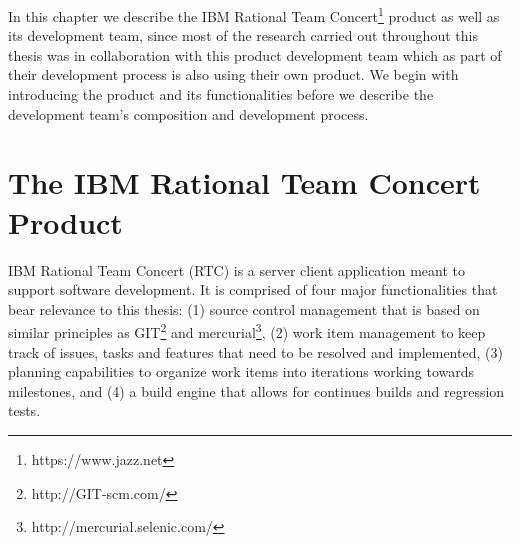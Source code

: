 \label{chap:rtc}
In this chapter we describe the IBM Rational Team Concert\footnote{https://www.jazz.net} product as well as its development team,
since most of the research carried out throughout this thesis was in collaboration with this product development team which as part of their development process is also using their own product.
We begin with introducing the product and its functionalities before we describe the development team's composition and development process.

\section{The IBM Rational Team Concert Product}
IBM Rational Team Concert (RTC) is a server client application meant to support software development.
It is comprised of four major functionalities that bear relevance to this thesis:
(1) source control management that is based on similar principles as GIT\footnote{http://GIT-scm.com/} and mercurial\footnote{http://mercurial.selenic.com/}, (2) work item management to keep track of issues, tasks and features that need to be resolved and implemented, (3) planning capabilities to organize work items into iterations working towards milestones, and (4) a build engine that allows for continues builds and regression tests.

